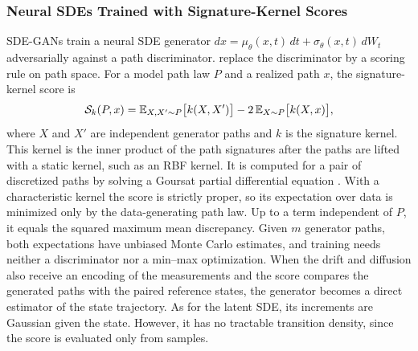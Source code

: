 \subsubsection{Neural SDEs Trained with Signature-Kernel Scores}\label{sec:related-sigker}
SDE-GANs \citep{kidger2021gan} train a neural SDE generator $dx=\mu_\theta(x,t)\,dt+\sigma_\theta(x,t)\,dW_t$ adversarially against a path discriminator. \citet{issa2023sigkernel} replace the discriminator by a scoring rule on path space. For a model path law $P$ and a realized path $x$, the signature-kernel score is
\begin{equation}\label{eq:sigker-score}
 \mathcal S_k(P,x)=\mathbb E_{X,X'\sim P}\bigl[k(X,X')\bigr]-2\,\mathbb E_{X\sim P}\bigl[k(X,x)\bigr],
\end{equation}
where $X$ and $X'$ are independent generator paths and $k$ is the signature kernel. This kernel is the inner product of the path signatures after the paths are lifted with a static kernel, such as an RBF kernel. It is computed for a pair of discretized paths by solving a Goursat partial differential equation \citep{salvi2021goursat}. With a characteristic kernel the score is strictly proper, so its expectation over data is minimized only by the data-generating path law. Up to a term independent of $P$, it equals the squared maximum mean discrepancy. Given $m$ generator paths, both expectations have unbiased Monte Carlo estimates, and training needs neither a discriminator nor a min--max optimization. When the drift and diffusion also receive an encoding of the measurements and the score compares the generated paths with the paired reference states, the generator becomes a direct estimator of the state trajectory. As for the latent SDE, its increments are Gaussian given the state. However, it has no tractable transition density, since the score is evaluated only from samples.


